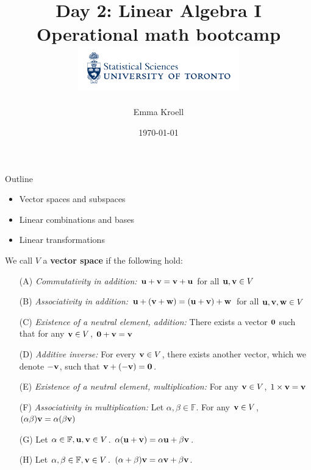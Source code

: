 \documentclass [aspectratio=169]{beamer}
\title[]{Day 2: Linear Algebra I \\ {\large Operational math bootcamp}\\ \includegraphics[width=7cm]{dept_logo.png}\vspace{-1em}}
\author[]{Emma Kroell}
\institute[]{University of Toronto}
\date{\today}
\begin{document}
{
\begin{frame}
    \titlepage
\end{frame}
}

\begin{frame}{Outline}
    \begin{itemize}
    	\item Vector spaces and subspaces
	\item Linear combinations and bases
	\item Linear transformations
    \end{itemize}
\end{frame}

\begin{frame}
\begin{definition}
We call $V$ a \textbf{vector space} if the following hold: \\

\begin{enumerate}
\setlength\itemsep{0.1em}
    \item[(A)] \textit{Commutativity in addition:} ${\mathbf{u}} + {\mathbf{v}} = {\mathbf{v}} + {\mathbf{u}}$ for all ${\mathbf{u}}, {\mathbf{v}} \in V$
    \item[(B)] \textit{Associativity in addition:} ${\mathbf{u}} + ({\mathbf{v}} + {\mathbf{w}}) = ({\mathbf{u}} + {\mathbf{v}}) + {\mathbf{w}}$ for all ${\mathbf{u}}, {\mathbf{v}}, {\mathbf{w}} \in V$
    \item[(C)] \textit{Existence of a neutral element, addition:} There exists a vector ${\mathbf{0}}$ such that for any ${\mathbf{v}} \in V$, ${\mathbf{0}} + {\mathbf{v}} = {\mathbf{v}}$
    \item[(D)] \textit{Additive inverse:} For every ${\mathbf{v}} \in V$, there exists another vector, which we denote $-{\mathbf{v}}$, such that ${\mathbf{v}} + (-{\mathbf{v}}) = {\mathbf{0}}$.
\end{enumerate}


\begin{enumerate}
\setlength\itemsep{0.1em}
    \item[(E)] \textit{Existence of a neutral element, multiplication:} For any ${\mathbf{v}} \in V$, $1\times {\mathbf{v}} = {\mathbf{v}}$
    \item[(F)] \textit{Associativity in multiplication:} Let $\alpha, \beta \in \mathbb{F}$. For any ${\mathbf{v}} \in V$, $(\alpha \beta) {\mathbf{v}} = \alpha (\beta {\mathbf{v}})$ 
\end{enumerate}

\begin{enumerate}
\setlength\itemsep{0.1em}
    \item[(G)] Let $\alpha \in \mathbb{F}, {\mathbf{u}}, {\mathbf{v}} \in V$. $\alpha ({\mathbf{u}} + {\mathbf{v}}) = \alpha {\mathbf{u}} + \beta {\mathbf{v}}$.
    \item[(H)] Let $\alpha, \beta \in \mathbb{F}, {\mathbf{v}} \in V$. $(\alpha + \beta) {\mathbf{v}} = \alpha {\mathbf{v}} + \beta {\mathbf{v}}$.
\end{enumerate}
\end{definition}

\end{frame}
\end{document}
